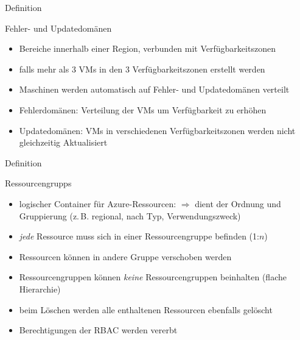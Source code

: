 \documentclass{scrartcl}
\newenvironment{flashcard}[2][]{%
    #1
    \vfill
    \centerline{\Large{#2}}
    \vfill
\newpage
}
{\newpage}
\begin{document}
    \begin{flashcard}[Definition]{Fehler- und Updatedomänen}
        \begin{itemize}
            \item Bereiche innerhalb einer Region, verbunden mit Verfügbarkeitszonen
            \item falls mehr als 3 VMs in den 3 Verfügbarkeitszonen erstellt werden
            \item Maschinen werden automatisch auf Fehler- und Updatedomänen verteilt
            \item Fehlerdomänen:\newline
                Verteilung der VMs um Verfügbarkeit zu erhöhen
            \item Updatedomänen:\newline
                VMs in verschiedenen Verfügbarkeitszonen werden nicht gleichzeitig Aktualisiert
        \end{itemize}
    \end{flashcard}
    
    \begin{flashcard}[Definition]{Ressourcengrupps}
        \begin{itemize}
            \item logischer Container für Azure-Ressourcen:\newline
            $\Rightarrow$ dient der Ordnung und Gruppierung (z.\,B. regional, nach Typ, Verwendungszweck)
            \item \emph{jede} Ressource muss sich in einer Ressourcengruppe befinden (1:$n$)
            \item Ressourcen können in andere Gruppe verschoben werden
            \item Ressourcengruppen können \emph{keine} Ressourcengruppen beinhalten (flache Hierarchie)
            \item beim Löschen werden alle enthaltenen Ressourcen ebenfalls gelöscht
            \item Berechtigungen der RBAC werden vererbt
        \end{itemize}

    \end{flashcard}
    
\end{document}
